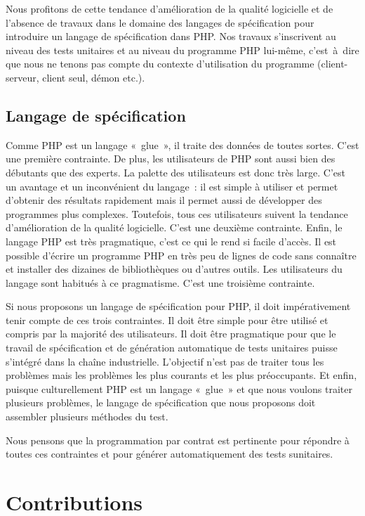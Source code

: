 Nous profitons de cette tendance d'amélioration de la qualité logicielle et de
l'absence de travaux dans le domaine des langages de spécification pour
introduire un langage de spécification dans PHP. Nos travaux s'inscrivent au
niveau des tests unitaires et au niveau du programme PHP lui-même, c'est~à~dire
que nous ne tenons pas compte du contexte d'utilisation du programme
(client-serveur, client seul, démon etc.).

\subsection{Langage de spécification}

Comme PHP est un langage «~glue~», il traite des données de toutes sortes.
C'est une première contrainte. De plus, les utilisateurs de PHP sont aussi bien
des débutants que des experts. La palette des utilisateurs est donc très large.
C'est un avantage et un inconvénient du langage~: il est simple à utiliser et
permet d'obtenir des résultats rapidement mais il permet aussi de développer des
programmes plus complexes. Toutefois, tous ces utilisateurs suivent la tendance
d'amélioration de la qualité logicielle. C'est une deuxième contrainte. Enfin,
le langage PHP est très pragmatique, c'est ce qui le rend si facile d'accès. Il
est possible d'écrire un programme PHP en très peu de lignes de code sans
connaître et installer des dizaines de bibliothèques ou d'autres outils. Les
utilisateurs du langage sont habitués à ce pragmatisme. C'est une troisième
contrainte.

Si nous proposons un langage de spécification pour PHP, il doit impérativement
tenir compte de ces trois contraintes. Il doit être simple pour être utilisé et
compris par la majorité des utilisateurs. Il doit être pragmatique pour que le
travail de spécification et de génération automatique de tests unitaires puisse
s'intégré dans la chaîne industrielle.  L'objectif n'est pas de traiter tous les
problèmes mais les problèmes les plus courants et les plus préoccupants. Et
enfin, puisque culturellement PHP est un langage «~glue~» et que nous voulons
traiter plusieurs problèmes, le langage de spécification que nous proposons doit
assembler plusieurs méthodes du test.

Nous pensons que la programmation par contrat est pertinente pour répondre à
toutes ces contraintes et pour générer automatiquement des tests sunitaires.

\section{Contributions}
\label{section:introduction:contributions}

